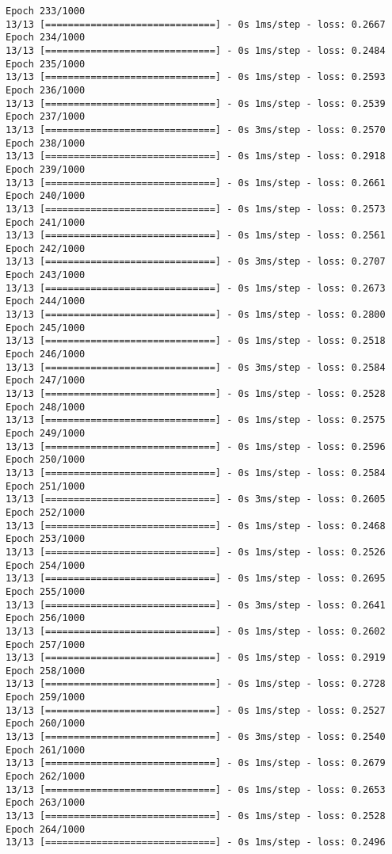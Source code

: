 \documentclass[11pt]{article}
\begin{document}
\begin{Verbatim}[commandchars=\\\{\}]
Epoch 233/1000
13/13 [==============================] - 0s 1ms/step - loss: 0.2667
Epoch 234/1000
13/13 [==============================] - 0s 1ms/step - loss: 0.2484
Epoch 235/1000
13/13 [==============================] - 0s 1ms/step - loss: 0.2593
Epoch 236/1000
13/13 [==============================] - 0s 1ms/step - loss: 0.2539
Epoch 237/1000
13/13 [==============================] - 0s 3ms/step - loss: 0.2570
Epoch 238/1000
13/13 [==============================] - 0s 1ms/step - loss: 0.2918
Epoch 239/1000
13/13 [==============================] - 0s 1ms/step - loss: 0.2661
Epoch 240/1000
13/13 [==============================] - 0s 1ms/step - loss: 0.2573
Epoch 241/1000
13/13 [==============================] - 0s 1ms/step - loss: 0.2561
Epoch 242/1000
13/13 [==============================] - 0s 3ms/step - loss: 0.2707
Epoch 243/1000
13/13 [==============================] - 0s 1ms/step - loss: 0.2673
Epoch 244/1000
13/13 [==============================] - 0s 1ms/step - loss: 0.2800
Epoch 245/1000
13/13 [==============================] - 0s 1ms/step - loss: 0.2518
Epoch 246/1000
13/13 [==============================] - 0s 3ms/step - loss: 0.2584
Epoch 247/1000
13/13 [==============================] - 0s 1ms/step - loss: 0.2528
Epoch 248/1000
13/13 [==============================] - 0s 1ms/step - loss: 0.2575
Epoch 249/1000
13/13 [==============================] - 0s 1ms/step - loss: 0.2596
Epoch 250/1000
13/13 [==============================] - 0s 1ms/step - loss: 0.2584
Epoch 251/1000
13/13 [==============================] - 0s 3ms/step - loss: 0.2605
Epoch 252/1000
13/13 [==============================] - 0s 1ms/step - loss: 0.2468
Epoch 253/1000
13/13 [==============================] - 0s 1ms/step - loss: 0.2526
Epoch 254/1000
13/13 [==============================] - 0s 1ms/step - loss: 0.2695
Epoch 255/1000
13/13 [==============================] - 0s 3ms/step - loss: 0.2641
Epoch 256/1000
13/13 [==============================] - 0s 1ms/step - loss: 0.2602
Epoch 257/1000
13/13 [==============================] - 0s 1ms/step - loss: 0.2919
Epoch 258/1000
13/13 [==============================] - 0s 1ms/step - loss: 0.2728
Epoch 259/1000
13/13 [==============================] - 0s 1ms/step - loss: 0.2527
Epoch 260/1000
13/13 [==============================] - 0s 3ms/step - loss: 0.2540
Epoch 261/1000
13/13 [==============================] - 0s 1ms/step - loss: 0.2679
Epoch 262/1000
13/13 [==============================] - 0s 1ms/step - loss: 0.2653
Epoch 263/1000
13/13 [==============================] - 0s 1ms/step - loss: 0.2528
Epoch 264/1000
13/13 [==============================] - 0s 1ms/step - loss: 0.2496

\end{Verbatim}
\end{document}
